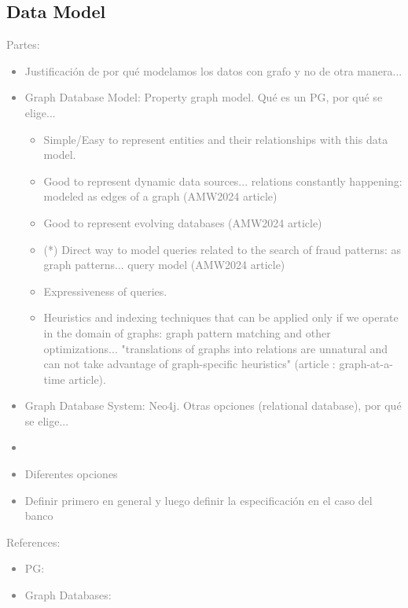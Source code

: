 
\subsection{Data Model}


\textcolor{gray}{Partes:
\begin{itemize}
    \item Justificación de por qué modelamos los datos con grafo y no de otra manera...
    \item Graph Database Model: Property graph model. Qué es un PG, por qué se elige...
    \begin{itemize}
        \item Simple/Easy to represent entities and their relationships with this data model.
        \item Good to represent dynamic data sources... relations constantly happening: modeled as edges of a graph (AMW2024 article)
        \item Good to represent evolving databases (AMW2024 article)
        \item (*) Direct way to model queries related to the search of fraud patterns: as graph patterns... query model (AMW2024 article) 
        \item Expressiveness of queries.
        \item Heuristics and indexing techniques that can be applied only if we operate in the domain of graphs: graph pattern matching and other optimizations... "translations of graphs into relations are unnatural and can not take advantage of graph-specific heuristics" (article \cite{PG-Graphs-at-a-time-GraphQL-QueryLanguage}: graph-at-a-time article).
    \end{itemize}
    \item Graph Database System: Neo4j. Otras opciones (relational database), por qué se elige...
    \item 
    \item Diferentes opciones
    \item Definir primero en general y luego definir la especificación en el caso del banco
\end{itemize}
References:
    \begin{itemize}
        \item PG: \cite{PG-angles2017foundations, PG-angles2018propertyGraphDatabaseModel, PG-Graphs-at-a-time-GraphQL-QueryLanguage, PG-exampleUsageSimeonovski}
        \item Graph Databases: \textcolor{blue}{\cite{GDB-angles2008survey, GDB-kumar2015graph}}
    \end{itemize}
}

